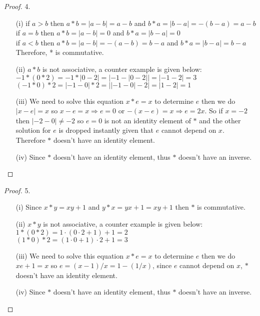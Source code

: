 \documentclass[11pt]{article}
\begin{document}
\begin{proof}{4.}
\begin{itemize}
\item [(i)] if $a>b$ then $a * b = \mathopen|a-b\mathclose| = a-b$ and $b * a = \mathopen|b-a\mathclose| = -(b-a)=a-b$\\
if $a=b$ then $a * b = \mathopen|a-b\mathclose| = 0$ and $b * a = \mathopen|b-a\mathclose| = 0$\\
if $a<b$ then $a * b = \mathopen|a-b\mathclose| = -(a-b) = b-a$ and $b * a = \mathopen|b-a\mathclose| = b-a$\\
Therefore, * is commutative.
\item [(ii)] $a*b$ is not associative, a counter example is given below: \\
$-1 * (0 * 2) = -1 * \mathopen|0-2\mathclose| = \mathopen|-1 - \mathopen|0-2\mathclose|\mathclose|= \mathopen|-1-2\mathclose|= 3$\\
$(-1 * 0) * 2 = \mathopen|-1-0\mathclose| * 2 = \mathopen|\mathopen|-1-0\mathclose| -2\mathclose|= \mathopen|1-2\mathclose|= 1$
\item [(iii)] We need to solve this equation $x*e=x$ to determine $e$ then we do $\mathopen|x-e\mathclose| =x$ so $x-e = x \Rightarrow e = 0$ or $-(x-e) = x \Rightarrow e = 2x$. So if $x=-2$ then $\mathopen|-2-0\mathclose| \neq -2$ so $e=0$ is not an identity element of $*$ and the other solution for $e$ is dropped instantly given that $e$ cannot depend on $x$. Therefore $*$ doesn't have an identity element.
\item [(iv)] Since $*$ doesn't have an identity element, thus $*$ doesn't have an inverse. 
\end{itemize}
\end{proof}

\begin{proof}{5.}
\begin{itemize}
\item [(i)] Since $x*y = xy + 1$ and $y*x=yx+1=xy+1$ then $*$ is commutative.
\item [(ii)] $x*y$ is not associative, a counter example is given below: \\
$1 * (0 * 2) = 1\cdot(0\cdot2 +1) +1 = 2$\\
$(1 * 0) * 2 = (1\cdot0 +1)\cdot2 +1 = 3$
\item [(iii)] We need to solve this equation $x*e=x$ to determine $e$ then we do $xe+1=x$ so $e=(x-1)/x=1-(1/x)$, since $e$ cannot depend on $x$, $*$ doesn't have an identity element.
\item [(iv)] Since $*$ doesn't have an identity element, thus $*$ doesn't have an inverse. 
\end{itemize}
\end{proof}
\end{document}
